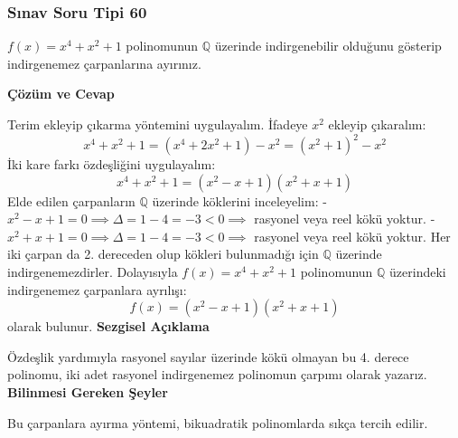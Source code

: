 \documentclass[11pt, a4paper]{article}
\newenvironment{cozum}{
    \vspace{0.5cm}
    \noindent\textcolor{green!60!black}{\faCheckCircle\enspace \textbf{\Large Çözüm ve Cevap}}\par\vspace{0.2cm}
}{}
\newenvironment{sezgisel}{
    \vspace{0.5cm}
    \noindent\textcolor{orange!80!black}{\faLightbulb\enspace \textbf{\Large Sezgisel Açıklama}}\par\vspace{0.2cm}
    \itshape
}{}
\newenvironment{bilgi}{
    \vspace{0.5cm}
    \noindent\textcolor{red!70!black}{\faExclamationTriangle\enspace \textbf{\Large Bilinmesi Gereken Şeyler}}\par\vspace{0.2cm}
}{}
\begin{document}
\subsubsection{Sınav Soru Tipi 60}
\begin{sinavbox}
$f(x) = x^4+x^2+1$ polinomunun $\mathbb{Q}$ üzerinde indirgenebilir olduğunu gösterip indirgenemez çarpanlarına ayırınız.
\end{sinavbox}
\begin{cozum}
Terim ekleyip çıkarma yöntemini uygulayalım. İfadeye $x^2$ ekleyip çıkaralım:
\[ x^4+x^2+1 = (x^4 + 2x^2 + 1) - x^2 = (x^2+1)^2 - x^2 \]
İki kare farkı özdeşliğini uygulayalım:
\[ x^4+x^2+1 = (x^2 - x + 1)(x^2 + x + 1) \]
Elde edilen çarpanların $\mathbb{Q}$ üzerinde köklerini inceleyelim:
- $x^2-x+1 = 0 \implies \Delta = 1 - 4 = -3 < 0 \implies$ rasyonel veya reel kökü yoktur.
- $x^2+x+1 = 0 \implies \Delta = 1 - 4 = -3 < 0 \implies$ rasyonel veya reel kökü yoktur.
Her iki çarpan da 2. dereceden olup kökleri bulunmadığı için $\mathbb{Q}$ üzerinde indirgenemezdirler.
Dolayısıyla $f(x) = x^4+x^2+1$ polinomunun $\mathbb{Q}$ üzerindeki indirgenemez çarpanlara ayrılışı:
\[ f(x) = (x^2-x+1)(x^2+x+1) \]
olarak bulunur.
\end{cozum}
\begin{sezgisel}
Özdeşlik yardımıyla rasyonel sayılar üzerinde kökü olmayan bu 4. derece polinomu, iki adet rasyonel indirgenemez polinomun çarpımı olarak yazarız.
\end{sezgisel}
\begin{bilgi}
Bu çarpanlara ayırma yöntemi, bikuadratik polinomlarda sıkça tercih edilir.
\end{bilgi}
\end{document}
